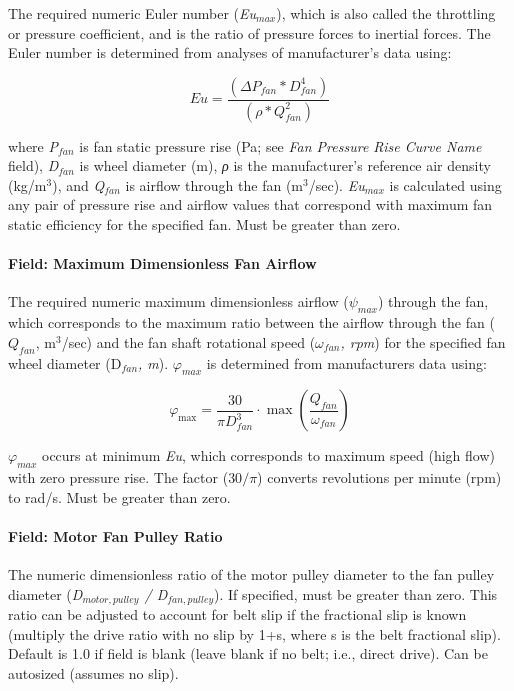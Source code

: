 The required numeric Euler number (\emph{Eu\(_{max}\)}), which is also called the throttling or pressure coefficient, and is the ratio of pressure forces to inertial forces. The Euler number is determined from analyses of manufacturer's data using:

\begin{equation}
Eu = \frac{{\left( {\Delta {P_{fan}} * D_{fan}^4} \right)}}{{\left( {\rho  * Q_{fan}^2} \right)}}
\end{equation}

where \emph{P\(_{fan}\)} is fan static pressure rise (Pa; see \emph{Fan Pressure Rise Curve Name} field), \emph{D\(_{fan}\)} is wheel diameter (m), \emph{ρ} is the manufacturer's reference air density (kg/m\(^{3}\)), and \emph{Q\(_{fan}\)} is airflow through the fan (m\(^{3}\)/sec). \emph{Eu\(_{max}\)} is calculated using any pair of pressure rise and airflow values that correspond with maximum fan static efficiency for the specified fan. Must be greater than zero.

\paragraph{Field: Maximum Dimensionless Fan Airflow}\label{field-maximum-dimensionless-fan-airflow}

The required numeric maximum dimensionless airflow (\(\psi_{max}\)) through the fan, which corresponds to the maximum ratio between the airflow through the fan (\(Q_{fan}\), m\(^{3}\)/sec) and the fan shaft rotational speed (\(\omega_{fan}\)\emph{, rpm}) for the specified fan wheel diameter (D\(_{fan}\)\emph{, m}). \(\varphi_{max}\) is determined from manufacturers data using:

\begin{equation}
\varphi_{\max} = \frac{30}{\pi D_{fan}^3} \cdot \max \left( \frac{Q_{fan}}{\omega_{fan}} \right)
\end{equation}

\(\varphi_{max}\) occurs at minimum \emph{Eu}, which corresponds to maximum speed (high flow) with zero pressure rise. The factor (\(30/\pi\)) converts revolutions per minute (rpm) to rad/s. Must be greater than zero.

\paragraph{Field: Motor Fan Pulley Ratio}\label{field-motor-fan-pulley-ratio}

The numeric dimensionless ratio of the motor pulley diameter to the fan pulley diameter (\emph{D\(_{motor,pulley}\) / D\(_{fan,pulley}\)}). If specified, must be greater than zero. This ratio can be adjusted to account for belt slip if the fractional slip is known (multiply the drive ratio with no slip by 1+s, where s is the belt fractional slip). Default is 1.0 if field is blank (leave blank if no belt; i.e., direct drive). Can be autosized (assumes no slip).

